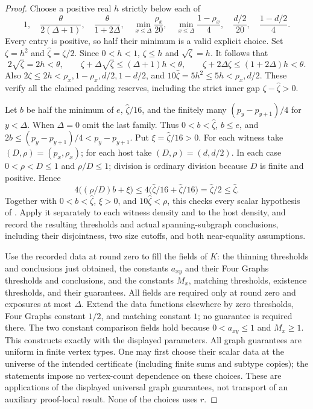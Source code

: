 \begin{proof}
Choose a positive real $h$ strictly below each of
\[
 1,\quad\frac{\theta}{2(\Delta+1)},\quad
 \frac{\theta}{1+2\Delta},\quad
 \min_{x\leq\Delta}\frac{\rho_x}{20},\quad
 \min_{x\leq\Delta}\frac{1-\rho_x}{4},\quad
 \frac{d/2}{20},\quad\frac{1-d/2}{4}.
\]
Every entry is positive, so half their minimum is a valid explicit
choice. Set $\zeta=h^2$ and $\widehat\zeta=\zeta/2$.
Since $0<h<1$, $\zeta\leq h$ and $\sqrt\zeta=h$.
It follows that
\[
 2\sqrt\zeta=2h<\theta,\qquad
 \zeta+\Delta\sqrt\zeta\leq(\Delta+1)h<\theta,\qquad
 \zeta+2\Delta\zeta\leq(1+2\Delta)h<\theta.
\]
Also $2\zeta\leq2h<\rho_x,1-\rho_x,d/2,1-d/2$, and
$10\widehat\zeta=5h^2\leq5h<\rho_x,d/2$.
These verify all the claimed padding reserves, including the strict
inner gap $\zeta-\widehat\zeta>0$.

Let $b$ be half the minimum of $e$, $\widehat\zeta/16$, and the
finitely many $(p_y-p_{y+1})/4$ for $y<\Delta$.
When $\Delta=0$ omit the last family. Thus
$0<b<\widehat\zeta$, $b\leq e$, and
$2b\leq(p_y-p_{y+1})/4<p_y-p_{y+1}$.
Put $\xi=\widehat\zeta/16>0$.
For each witness take $(D,\rho)=(p_x,\rho_x)$; for each host take
$(D,\rho)=(d,d/2)$. In each case $0<\rho<D\leq1$ and
$\rho/D\leq1$; division is ordinary division because $D$ is finite
and positive. Hence
\[
 4\bigl((\rho/D)b+\xi\bigr)
 \leq4\bigl(\widehat\zeta/16+\widehat\zeta/16\bigr)
 =\widehat\zeta/2\leq\widehat\zeta.
\]
Together with $0<b<\widehat\zeta$, $\xi>0$, and
$10\widehat\zeta<\rho$, this checks every scalar hypothesis of
. Apply it separately to
each witness density and to the host density, and record the resulting
thresholds and actual spanning-subgraph conclusions, including their
disjointness, two size cutoffs, and both near-equality assumptions.

Use the recorded data at round zero to fill the fields of $K$:
the thinning thresholds and conclusions just obtained, the constants
$a_{xy}$ and their Four Graphs thresholds and conclusions, and the
constants $M_x$, matching thresholds, existence thresholds, and their
guarantees. All fields are required only at round zero and exposures
at most $\Delta$. Extend the data functions elsewhere by zero thresholds,
Four Graphs constant $1/2$, and matching constant $1$; no guarantee is
required there. The two constant comparison fields hold because
$0<a_{xy}\leq1$ and $M_x\geq1$. This constructs exactly
 with the displayed parameters.
All graph guarantees are uniform in finite vertex types. One may first
choose their scalar data at the universe of the intended certificate
(including finite sums and subtype copies); the statements impose no
vertex-count dependence on these choices. These are applications of the
displayed universal graph guarantees, not transport of an auxiliary
proof-local result. None of the choices uses $r$.
\end{proof}
